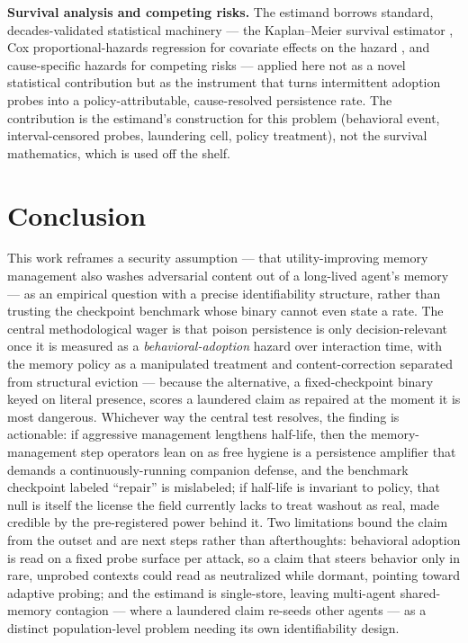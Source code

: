 \documentclass[11pt]{article}
\begin{document}
\textbf{Survival analysis and competing risks.} The estimand borrows standard, decades-validated statistical machinery --- the Kaplan--Meier survival estimator \citep{kaplan1958nonparametric}, Cox proportional-hazards regression for covariate effects on the hazard \citep{cox1972regression}, and cause-specific hazards for competing risks --- applied here not as a novel statistical contribution but as the instrument that turns intermittent adoption probes into a policy-attributable, cause-resolved persistence rate. The contribution is the estimand's construction for this problem (behavioral event, interval-censored probes, laundering cell, policy treatment), not the survival mathematics, which is used off the shelf.

\section{Conclusion}

This work reframes a security assumption --- that utility-improving memory management also washes adversarial content out of a long-lived agent's memory --- as an empirical question with a precise identifiability structure, rather than trusting the checkpoint benchmark whose binary cannot even state a rate. The central methodological wager is that poison persistence is only decision-relevant once it is measured as a \emph{behavioral-adoption} hazard over interaction time, with the memory policy as a manipulated treatment and content-correction separated from structural eviction --- because the alternative, a fixed-checkpoint binary keyed on literal presence, scores a laundered claim as repaired at the moment it is most dangerous. Whichever way the central test resolves, the finding is actionable: if aggressive management lengthens half-life, then the memory-management step operators lean on as free hygiene is a persistence amplifier that demands a continuously-running companion defense, and the benchmark checkpoint labeled ``repair'' is mislabeled; if half-life is invariant to policy, that null is itself the license the field currently lacks to treat washout as real, made credible by the pre-registered power behind it. Two limitations bound the claim from the outset and are next steps rather than afterthoughts: behavioral adoption is read on a fixed probe surface per attack, so a claim that steers behavior only in rare, unprobed contexts could read as neutralized while dormant, pointing toward adaptive probing; and the estimand is single-store, leaving multi-agent shared-memory contagion --- where a laundered claim re-seeds other agents --- as a distinct population-level problem needing its own identifiability design.



\end{document}
